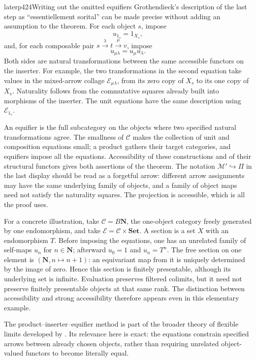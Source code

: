 \begin{dcomment}{later}{p424}{Writing out the omitted equifiers}
Grothendieck's description of the last step as ``essentiellement sorital'' can be made precise without adding an assumption to the theorem. For each object $s$, impose
\[
 u_{1_s}=1_{X_s},
\]
and, for each composable pair $s\xrightarrow{\lambda}t\xrightarrow{\mu}v$, impose
\[
 u_{\mu\lambda}=u_\mu u_\lambda.
\]
Both sides are natural transformations between the same accessible functors on the inserter. For example, the two transformations in the second equation take values in the mixed-arrow collage $\mathcal E_{\mu\lambda}$, from its zero copy of $X_s$ to its one copy of $X_v$. Naturality follows from the commutative squares already built into morphisms of the inserter. The unit equations have the same description using $\mathcal E_{1_s}$.

An equifier is the full subcategory on the objects where two specified natural transformations agree. The smallness of $\mathcal C$ makes the collection of unit and composition equations small; a product gathers their target categories, and equifiers impose all the equations. Accessibility of these constructions and of their structural functors gives both assertions of the theorem. The notation $\mathcal M'\hookrightarrow\Pi$ in the last display should be read as a forgetful arrow: different arrow assignments may have the same underlying family of objects, and a family of object maps need not satisfy the naturality squares. The projection is accessible, which is all the proof uses.

For a concrete illustration, take $\mathcal C=B\mathbf N$, the one-object category freely generated by one endomorphism, and take $\mathcal E=\mathcal C\times\mathbf{Set}$. A section is a set $X$ with an endomorphism $T$. Before imposing the equations, one has an unrelated family of self-maps $u_n$ for $n\in\mathbf N$; afterward $u_0=1$ and $u_n=T^n$. The free section on one element is $(\mathbf N,n\mapsto n+1)$: an equivariant map from it is uniquely determined by the image of zero. Hence this section is finitely presentable, although its underlying set is infinite. Evaluation preserves filtered colimits, but it need not preserve finitely presentable objects at that same rank. The distinction between accessibility and strong accessibility therefore appears even in this elementary example.

The product--inserter--equifier method is part of the broader theory of flexible limits developed by \citet{BirdKellyPowerStreet1989}. Its relevance here is exact: the equations constrain specified arrows between already chosen objects, rather than requiring unrelated object-valued functors to become literally equal.
\end{dcomment}

